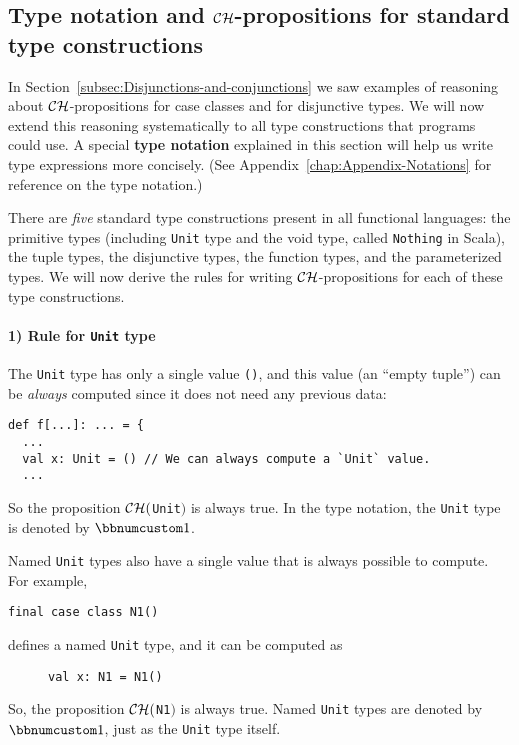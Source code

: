\subsection{Type notation and ${\cal CH}$-propositions for standard type constructions\label{subsec:Type-notation-and-standard-type-constructions}}

In Section~\ref{subsec:Disjunctions-and-conjunctions} we saw examples
of reasoning about ${\cal CH}$-propositions for case classes and
for disjunctive types. We will now extend this reasoning systematically
to all type constructions that programs could use. A special \textbf{type
notation} explained in this section will help
us write type expressions more concisely. (See Appendix~\ref{chap:Appendix-Notations}
for reference on the type notation.)

There are \emph{five} standard type constructions present in all functional
languages: the primitive types (including \lstinline!Unit! type and
the void type, called \lstinline!Nothing! in Scala), the tuple types,
the disjunctive types, the function types, and the parameterized types.
We will now derive the rules for writing ${\cal CH}$-propositions
for each of these type constructions.

\paragraph{1) Rule for \lstinline!Unit! type}

The \lstinline!Unit! type has only a single value \lstinline!()!,
and this value (an ``empty tuple'') can be \emph{always} computed
since it does not need any previous data:
\begin{lstlisting}
def f[...]: ... = {
  ...
  val x: Unit = () // We can always compute a `Unit` value.
  ...
\end{lstlisting}
So the proposition ${\cal CH}($\lstinline!Unit!$)$ is always true.
In the type notation, the \lstinline!Unit! type is denoted by $\bbnum 1$.

Named \lstinline!Unit! types also have a
single value that is always possible to compute. For example,
\begin{lstlisting}
final case class N1()
\end{lstlisting}
defines a named \lstinline!Unit! type, and it can be computed as

\begin{wrapfigure}{l}{0.4\columnwidth}%
\vspace{-0.7\baselineskip}
\begin{lstlisting}
val x: N1 = N1()
\end{lstlisting}

\vspace{-0.9\baselineskip}
\end{wrapfigure}%
So, the proposition ${\cal CH}($\lstinline!N1!$)$ is always true.
Named \lstinline!Unit! types are denoted by $\bbnum 1$, just as
the \lstinline!Unit! type itself.

